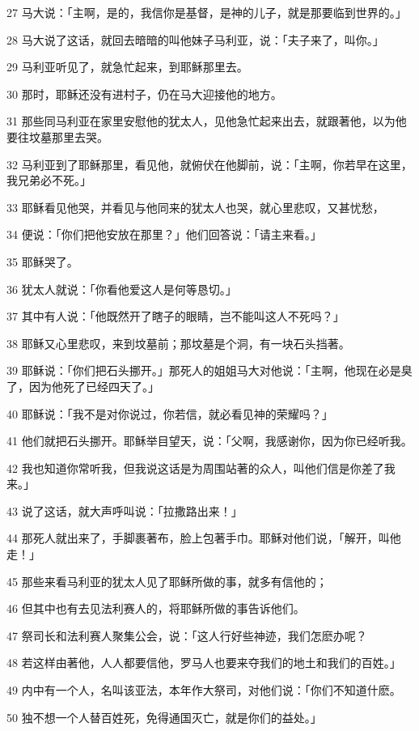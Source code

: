 \par 27 马大说：「主啊，是的，我信你是基督，是神的儿子，就是那要临到世界的。」
\par 28 马大说了这话，就回去暗暗的叫他妹子马利亚，说：「夫子来了，叫你。」
\par 29 马利亚听见了，就急忙起来，到耶稣那里去。
\par 30 那时，耶稣还没有进村子，仍在马大迎接他的地方。
\par 31 那些同马利亚在家里安慰他的犹太人，见他急忙起来出去，就跟著他，以为他要往坟墓那里去哭。
\par 32 马利亚到了耶稣那里，看见他，就俯伏在他脚前，说：「主啊，你若早在这里，我兄弟必不死。」
\par 33 耶稣看见他哭，并看见与他同来的犹太人也哭，就心里悲叹，又甚忧愁，
\par 34 便说：「你们把他安放在那里？」他们回答说：「请主来看。」
\par 35 耶稣哭了。
\par 36 犹太人就说：「你看他爱这人是何等恳切。」
\par 37 其中有人说：「他既然开了瞎子的眼睛，岂不能叫这人不死吗？」
\par 38 耶稣又心里悲叹，来到坟墓前；那坟墓是个洞，有一块石头挡著。
\par 39 耶稣说：「你们把石头挪开。」那死人的姐姐马大对他说：「主啊，他现在必是臭了，因为他死了已经四天了。」
\par 40 耶稣说：「我不是对你说过，你若信，就必看见神的荣耀吗？」
\par 41 他们就把石头挪开。耶稣举目望天，说：「父啊，我感谢你，因为你已经听我。
\par 42 我也知道你常听我，但我说这话是为周围站著的众人，叫他们信是你差了我来。」
\par 43 说了这话，就大声呼叫说：「拉撒路出来！」
\par 44 那死人就出来了，手脚裹著布，脸上包著手巾。耶稣对他们说，「解开，叫他走！」
\par 45 那些来看马利亚的犹太人见了耶稣所做的事，就多有信他的；
\par 46 但其中也有去见法利赛人的，将耶稣所做的事告诉他们。
\par 47 祭司长和法利赛人聚集公会，说：「这人行好些神迹，我们怎麽办呢？
\par 48 若这样由著他，人人都要信他，罗马人也要来夺我们的地土和我们的百姓。」
\par 49 内中有一个人，名叫该亚法，本年作大祭司，对他们说：「你们不知道什麽。
\par 50 独不想一个人替百姓死，免得通国灭亡，就是你们的益处。」
